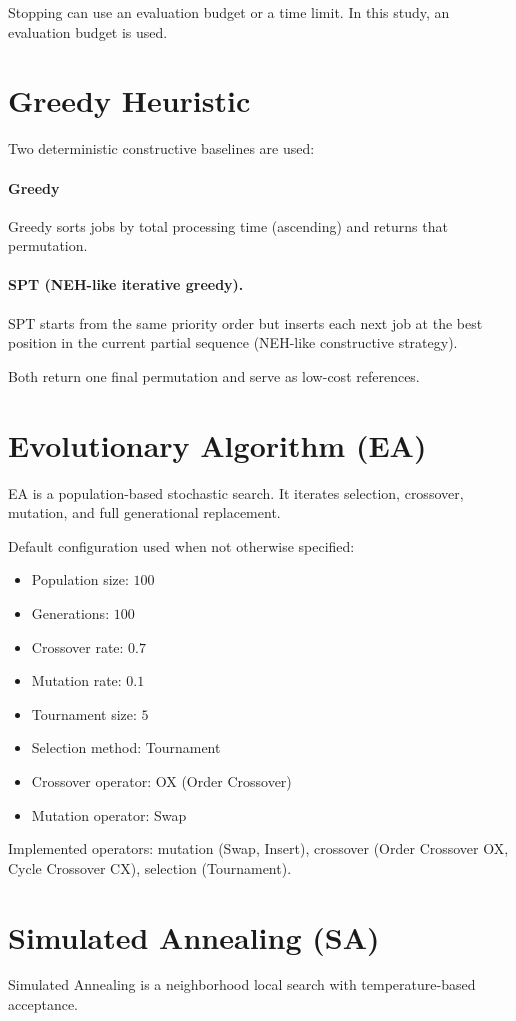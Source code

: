 \documentclass[12pt,a4paper]{report}
\begin{document}
Stopping can use an evaluation budget or a time limit. In this study, an evaluation budget is used.

\section{Greedy Heuristic}
Two deterministic constructive baselines are used:

\paragraph{Greedy}
Greedy sorts jobs by total processing time (ascending) and returns that permutation.

\paragraph{SPT (NEH-like iterative greedy).}
SPT starts from the same priority order but inserts each next job at the best position in the current partial sequence (NEH-like constructive strategy).

Both return one final permutation and serve as low-cost references.

\section{Evolutionary Algorithm (EA)}
EA is a population-based stochastic search. It iterates selection, crossover, mutation, and full generational replacement.

Default configuration used when not otherwise specified:
\begin{itemize}
    \item Population size: $100$
    \item Generations: $100$
    \item Crossover rate: $0.7$
    \item Mutation rate: $0.1$
    \item Tournament size: $5$
    \item Selection method: Tournament
    \item Crossover operator: OX (Order Crossover)
    \item Mutation operator: Swap
\end{itemize}

Implemented operators: mutation (Swap, Insert), crossover (Order Crossover OX, Cycle Crossover CX), selection (Tournament).

\section{Simulated Annealing (SA)}
Simulated Annealing is a neighborhood local search with temperature-based acceptance.
\end{document}
